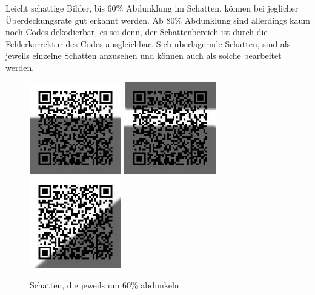 Leicht schattige Bilder, bis 60\% Abdunklung im Schatten, können bei jeglicher Überdeckungsrate gut erkannt werden. Ab 80\% Abdunklung sind allerdings kaum noch Codes dekodierbar, es sei denn, der Schattenbereich ist durch die Fehlerkorrektur des Codes ausgleichbar. Sich überlagernde Schatten, sind als jeweils einzelne Schatten anzusehen und können auch als solche bearbeitet werden.
\begin{figure}[H]
  \centering
  \includegraphics[height=4cm]{img/QR/shade_03_60+60.jpg}
  \includegraphics[height=4cm]{img/QR/shade_03_2x60.jpg}
  \includegraphics[height=4cm]{img/QR/shade_03_60+s40.jpg}
  \caption{Schatten, die jeweils um 60\% abdunkeln}
  \label{fig:qrdark}
\end{figure}

